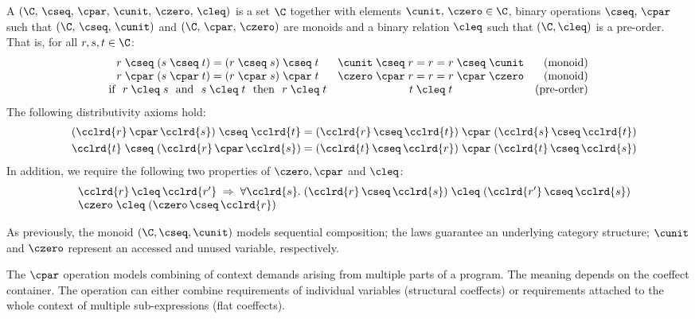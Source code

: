 \begin{definition}
A \emph{} $(\C, \,\cseq, \,\cpar, \,\cunit, \,\czero, \,\cleq)$ is a set
$\C$ together with elements $\cunit, \,\czero \in \C$, binary operations $\cseq, \,\cpar$ such that
$(\C, \,\cseq, \,\cunit)$ and $(\C, \,\cpar, \,\czero)$ are monoids and a binary relation $\cleq$ such
that $(\C, \cleq)$ is a pre-order. That is, for all $r,s,t\in \C$:
%
\begin{equation*}
\begin{array}{ccr}
r \;\cseq\; (s \;\cseq\; t) = (r \;\cseq\; s) \;\cseq\; t  &
\cunit \;\cseq\; r = r = r \;\cseq\; \cunit &
\textnormal{(monoid)}
\\
r \;\cpar\; (s \;\cpar\; t) = (r \;\cpar\; s) \;\cpar\; t &
\czero \;\cpar\; r = r = r \;\cpar\; \czero &
\textnormal{(monoid)}
\\
\textnormal{if}~~r\; \cleq\; s ~~\textnormal{and}~~s\; \cleq\; t~~\textnormal{then}~~r\; \cleq\; t&
t\; \cleq\; t &
\textnormal{(pre-order)}
\\
\end{array}
\end{equation*}
%
The following distributivity axioms hold:
\begin{align*}
\quad (\cclrd{r}\, \cpar\, \cclrd{s}) \;\cseq\; \cclrd{t} & = (\cclrd{r} \,\cseq\, \cclrd{t}) \;\cpar\; (\cclrd{s}\, \cseq\, \cclrd{t}) \\
\quad \cclrd{t} \;\cseq\; (\cclrd{r}\, \cpar\, \cclrd{s}) & = (\cclrd{t} \,\cseq\, \cclrd{r}) \;\cpar\; (\cclrd{t}\, \cseq\, \cclrd{s})
\end{align*}
%
In addition, we require the following two properties of $\czero, \cpar$ and $\cleq$:
\begin{equation*}
\begin{array}{l}
 \quad \cclrd{r}\,\cleq\,\cclrd{r'} \; \Rightarrow \; \forall\cclrd{s}.\;(\cclrd{r}\,\cseq\,\cclrd{s})\;\cleq\;(\cclrd{r'}\,\cseq\,\cclrd{s}) \\
 \quad \czero\;\cleq\;(\czero\,\cseq\,\cclrd{r})
\end{array}
\end{equation*}
\end{definition}

\noindent
As previously, the monoid $(\C,\cseq,\cunit)$ models sequential composition; the laws guarantee
an underlying category structure; $\cunit$ and $\czero$ represent an accessed and unused variable,
respectively.

The $\cpar$ operation models combining of context demands arising from multiple parts of a
program. The meaning depends on the coeffect container. The operation can either combine requirements
of individual variables (structural coeffects) or requirements attached to the whole context of
multiple sub-exp\-ressions (flat coeffects).

